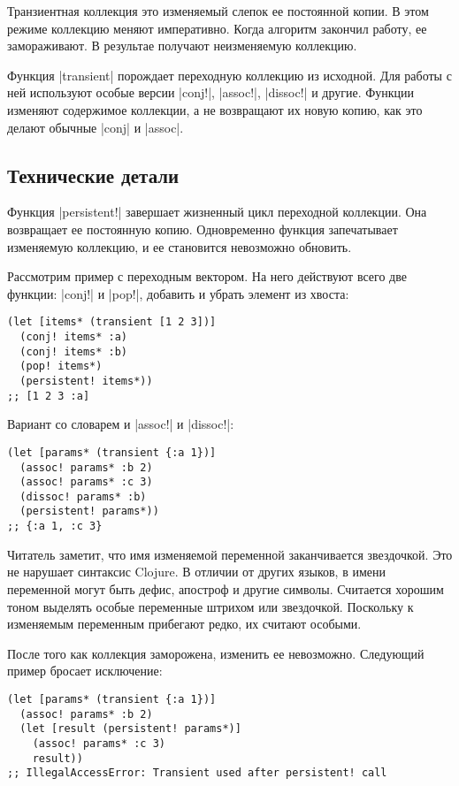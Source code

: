 Транзиентная коллекция это изменяемый слепок ее постоянной копии. В этом режиме
коллекцию меняют императивно. Когда алгоритм закончил работу, ее замораживают. В
результае получают неизменяемую коллекцию.

Функция \spverb|transient| порождает переходную коллекцию из исходной. Для работы с ней
используют особые версии \spverb|conj!|, \spverb|assoc!|, \spverb|dissoc!| и другие. Функции изменяют
содержимое коллекции, а не возвращают их новую копию, как это делают обычные
\spverb|conj| и \spverb|assoc|.

\subsection{Технические детали}

Функция \spverb|persistent!| завершает жизненный цикл переходной коллекции. Она
возвращает ее постоянную копию. Одновременно функция запечатывает изменяемую
коллекцию, и ее становится невозможно обновить.

Рассмотрим пример с переходным вектором. На него действуют всего две функции:
\spverb|conj!| и \spverb|pop!|, добавить и убрать элемент из хвоста:

\begin{verbatim}
(let [items* (transient [1 2 3])]
  (conj! items* :a)
  (conj! items* :b)
  (pop! items*)
  (persistent! items*))
;; [1 2 3 :a]
\end{verbatim}

Вариант со словарем и \spverb|assoc!| и \spverb|dissoc!|:

\begin{verbatim}
(let [params* (transient {:a 1})]
  (assoc! params* :b 2)
  (assoc! params* :c 3)
  (dissoc! params* :b)
  (persistent! params*))
;; {:a 1, :c 3}
\end{verbatim}

Читатель заметит, что имя изменяемой переменной заканчивается звездочкой. Это не
нарушает синтаксис Clojure. В отличии от других языков, в имени переменной могут
быть дефис, апостроф и другие символы. Считается хорошим тоном выделять особые
переменные штрихом или звездочкой. Поскольку к изменяемым переменным прибегают
редко, их считают особыми.

После того как коллекция заморожена, изменить ее невозможно. Следующий пример
бросает исключение:

\begin{verbatim}
(let [params* (transient {:a 1})]
  (assoc! params* :b 2)
  (let [result (persistent! params*)]
    (assoc! params* :c 3)
    result))
;; IllegalAccessError: Transient used after persistent! call
\end{verbatim}


